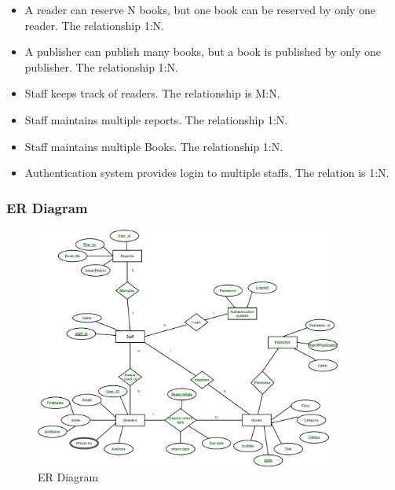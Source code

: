 \begin{itemize}
    \item A reader can reserve N books, but one book can be reserved by
          only one reader. The relationship 1:N.
    \item A publisher can publish many books, but a book is published by
          only one publisher. The relationship 1:N.
    \item Staff keeps track of readers. The relationship is M:N.
    \item Staff maintains multiple reports. The relationship 1:N.
    \item Staff maintains multiple Books. The relationship 1:N.
    \item Authentication system provides login to multiple staffs. The relation is 1:N.

\end{itemize}

\pagebreak

\subsubsection{ER Diagram}

\begin{figure}[ht]
    \centering
    \includegraphics[width=0.9\textwidth]{res/libraryER.png}
    \caption{ER Diagram}
    \label{fig:er-diagram}
\end{figure}
